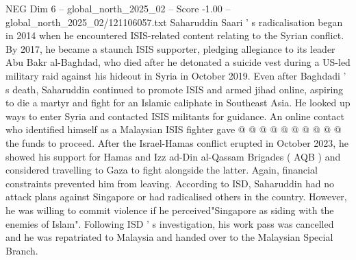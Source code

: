 \begin{textsample}{NEG Dim 6 – global\_north\_2025\_02 – Score -1.00 – global\_north\_2025\_02/121106057.txt}
Saharuddin Saari ' s radicalisation began in 2014 when he encountered ISIS-related content relating to the Syrian conflict.
By 2017, he became a staunch ISIS supporter, pledging allegiance to its leader Abu Bakr al-Baghdad, who died after he detonated a suicide vest during a US-led military raid against his hideout in Syria in October 2019.
Even after Baghdadi ' s death, Saharuddin continued to promote ISIS and armed jihad online, aspiring to die a martyr and fight for an Islamic caliphate in Southeast Asia.
He looked up ways to enter Syria and contacted ISIS militants for guidance.
An online contact who identified himself as a Malaysian ISIS fighter gave @ @ @ @ @ @ @ @ @ @ the funds to proceed.
After the Israel-Hamas conflict erupted in October 2023, he showed his support for Hamas and Izz ad-Din al-Qassam Brigades ( AQB ) and considered travelling to Gaza to fight alongside the latter.
Again, financial constraints prevented him from leaving.
According to ISD, Saharuddin had no attack plans against Singapore or had radicalised others in the country.
However, he was willing to commit violence if he perceived"Singapore as siding with the enemies of Islam".
Following ISD ' s investigation, his work pass was cancelled and he was repatriated to Malaysia and handed over to the Malaysian Special Branch.

\end{textsample}
